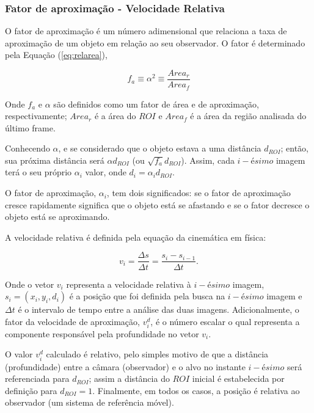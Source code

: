 \subsubsection{Fator de aproximação - Velocidade Relativa}

O fator de aproximação é um número adimensional que relaciona a taxa de 
aproximação de um objeto em relação ao seu observador.
O fator é determinado pela Equação (\ref{eq:relarea}),

\begin{equation}\label{eq:relarea}
f_a \equiv \alpha^2 \equiv \frac{Area_r}{Area_f} 
\end{equation}

Onde $f_a$ e $\alpha$ são definidos como um fator de área e de aproximação,
respectivamente; $Area_r$ é a área do $ROI$ e $Area_f$ é a área da região analisada
do último frame.

Conhecendo $\alpha$, e se considerado que o objeto estava a uma distância $d_{ROI}$; então,
sua próxima distância será $\alpha d_{ROI}$ (ou $\sqrt{f_a} d_{ROI}$). Assim, cada $i-ésimo$ imagem
terá o seu próprio $\alpha_i$ valor, onde $d_i=\alpha_i d_{ROI}$.

O fator de aproximação, $\alpha_i$, tem dois significados: se o fator de aproximação cresce rapidamente 
significa que o objeto está se afastando e se o fator decresce o objeto está se aproximando.

A velocidade relativa é definida pela equação da cinemática em física:

\begin{equation}
 v_i = \frac{\Delta s}{\Delta t}= \frac{s_i-s_{i-1}}{\Delta t}.
\end{equation}

Onde o vetor $v_i$ representa a velocidade relativa à $i-ésimo$ imagem, $s_i=(x_i,y_i,d_i)$ é a posição que
foi definida pela busca na $i-ésimo$ imagem e $\Delta t$ é o intervalo de tempo entre a análise das duas imagens.
Adicionalmente, o fator da velocidade de aproximação, $v^d_i$, é o número escalar o qual representa a componente
responsável pela profundidade no vetor $v_i$.

O valor $v^d_i$ calculado é relativo, pelo simples motivo de que a distância (profundidade) entre a câmara 
(observador) e o alvo no instante $i-ésimo$ será referenciada para $d_{ROI}$; assim a distância do $ROI$ 
inicial é estabelecida por definição para $d_{ROI}=1$. Finalmente, em todos os casos, a posição é 
relativa ao observador (um sistema de referência móvel).

